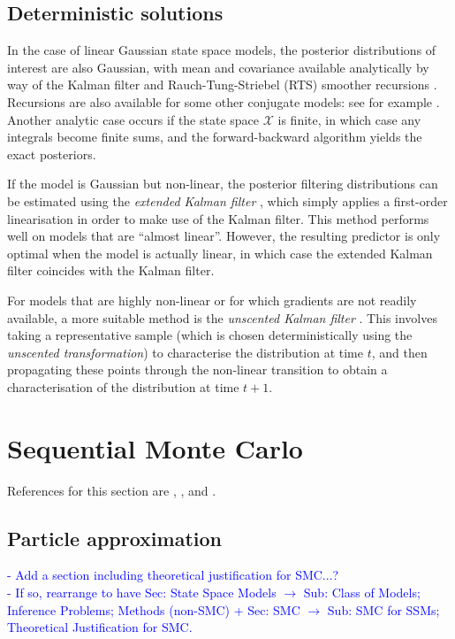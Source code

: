 \documentclass[fleqn]{article}
\theoremstyle{definition}
\begin{document}
\subsection{Deterministic solutions}
In the case of linear Gaussian state space models, the posterior distributions of interest are also Gaussian, with mean and covariance available analytically by way of the Kalman filter \citep{kalman1960} and Rauch-Tung-Striebel (RTS) smoother recursions \citep{rauch1965}. Recursions are also available for some other conjugate models: see for example \citet{vidoni1999}.
Another analytic case occurs if the state space $\mathcal{X}$ is finite, in which case any integrals become finite sums, and the forward-backward algorithm \citep{baum1970} yields the exact posteriors.

If the model is Gaussian but non-linear, the posterior filtering distributions can be estimated using the \emph{extended Kalman filter} \citep{jazwinski2007}, which simply applies a first-order linearisation in order to make use of the Kalman filter. This method performs well on models that are ``almost linear''. However, the resulting predictor is only optimal when the model is actually linear, in which case the extended Kalman filter coincides with the Kalman filter.

For models that are highly non-linear or for which gradients are not readily available, a more suitable method is the \emph{unscented Kalman filter} \citep{wan2000}. This involves taking a representative sample (which is chosen deterministically using the \emph{unscented transformation}) to characterise the distribution at time $t$, and then propagating these points through the non-linear transition to obtain a characterisation of the distribution at time $t+1$.


\section{Sequential Monte Carlo}\label{sec:SMC}
References for this section are \citet{doucet2001}, \citet{delmoral2006}, and \citet{doucet2009}.
\subsection{Particle approximation}
\textcolor{blue}{
- Add a section including theoretical justification for SMC...?\\
- If so, rearrange to have Sec: State Space Models $\rightarrow$ Sub: Class of Models; Inference Problems; Methods (non-SMC) + Sec: SMC $\rightarrow$ Sub: SMC for SSMs; Theoretical Justification for SMC.\\
}
\end{document}
